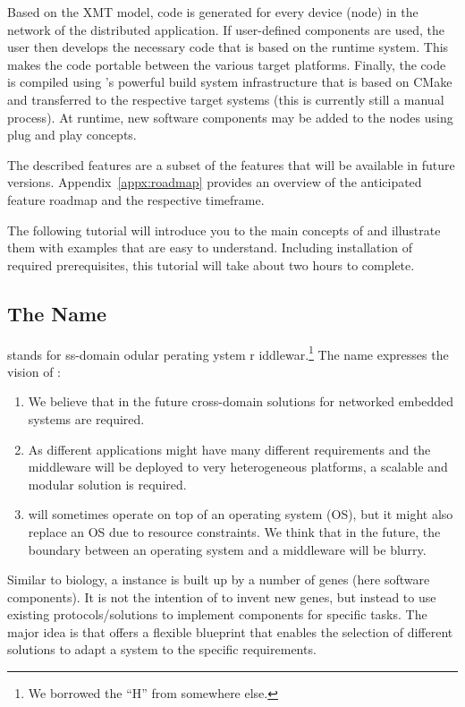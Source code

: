Based on the XMT model, code is generated for every device (node) in the network of the distributed application.
If user-defined components are used, the user then develops the necessary code that is based on the \xme runtime system.
This makes the code portable between the various target platforms.
Finally, the code is compiled using \xme's powerful build system infrastructure that is based on CMake
and transferred to the respective target systems (this is currently still a manual process).
At runtime, new software components may be added to the nodes using plug and play concepts.

The described features are a subset of the features that will be available in future versions.
Appendix~\ref{appx:roadmap} provides an overview of the anticipated feature roadmap and the respective timeframe.

The following tutorial will introduce you to the main concepts of \xme and illustrate them with examples that are easy to understand.
Including installation of required prerequisites, this tutorial will take about two hours to complete.

\clearpage

\subsection{The Name \xme}

\xme stands for \textbf{}ss-domain \textbf{}odular
\textbf{}perating \textbf{}ystem \textbf{}r
\textbf{}iddlewar\textbf{}.\footnote{We borrowed the ``H'' from somewhere else.}
The name expresses the vision of \xme:
\begin{enumerate}
	\item We believe that in the future cross-domain solutions for networked embedded systems are required.
	\item As different applications might have many different requirements
		and the middleware will be deployed to very heterogeneous platforms,
		a scalable and modular solution is required.
	\item \xme will sometimes operate on top of an operating system (OS),
		but it might also replace an OS due to resource constraints.
		We think that in the future, the boundary between an operating system and a middleware will be blurry.
\end{enumerate}

Similar to biology, a \xme instance is built up by a number of genes (here software components).
It is not the intention of \xme to invent new genes, but instead to use
existing protocols/solutions to implement components for specific tasks.
The major idea is that \xme offers a flexible blueprint that enables the
selection of different solutions to adapt a system to the specific requirements.

